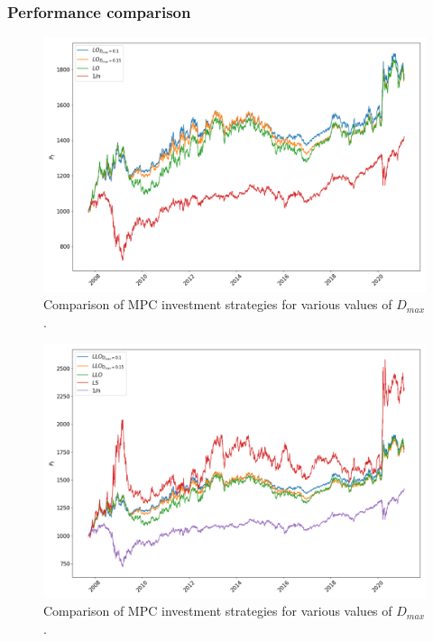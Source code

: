\subsubsection*{Performance comparison}

\begin{figure}[H]
    \centering
    \includegraphics[width=1\textwidth]{analysis/portfolio_exercise/images/mle/port_vals_lo.png}
    \caption[Comparison of MPC investment strategies for various values of $D_{max}$]{Comparison of MPC investment strategies for various values of $D_{max}$.}
    \label{fig:MPC_port_vals_lo}
\end{figure}

\begin{figure}[H]
    \centering
    \includegraphics[width=1\textwidth]{analysis/portfolio_exercise/images/mle/port_vals_llo.png}
    \caption[Comparison of MPC investment strategies for various values of $D_{max}$]{Comparison of MPC investment strategies for various values of $D_{max}$.}
    \label{fig:MPC_port_vals_llo}
\end{figure}


